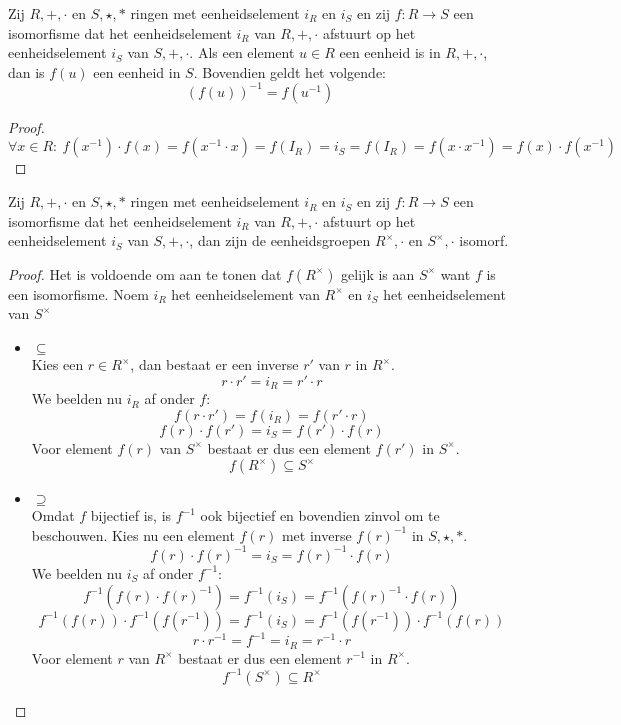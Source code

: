 \documentclass[main.tex]{subfiles}
\begin{document}
\begin{ei}
  \label{ei:ringmorfisme-behoudt-multiplicatieve-inverse}
  Zij $R,+,\cdot$ en $S,\star,*$ ringen met eenheidselement $i_{R}$ en $i_{S}$ en zij $f: R\rightarrow S$ een isomorfisme dat het eenheidselement $i_{R}$ van $R,+,\cdot$ afstuurt op het eenheidselement $i_{S}$ van $S,+,\cdot$.
  Als een element $u\in R$ een eenheid is in $R,+,\cdot$, dan is $f(u)$ een eenheid in $S$.
  Bovendien geldt het volgende:
  \[ (f(u))^{-1} = f(u^{-1}) \]

  \begin{proof}
    \[ \forall x \in R:\ f(x^{-1}) \cdot f(x) = f(x^{-1}\cdot x) = f(I_{R}) = i_{S} = f(I_{R}) = f(x\cdot x^{-1}) = f(x) \cdot f(x^{-1}) \]
  \end{proof}
\end{ei}


\begin{st}
  Zij $R,+,\cdot$ en $S,\star,*$ ringen met eenheidselement $i_{R}$ en $i_{S}$ en zij $f: R\rightarrow S$ een isomorfisme dat het eenheidselement $i_{R}$ van $R,+,\cdot$ afstuurt op het eenheidselement $i_{S}$ van $S,+,\cdot$, dan zijn de eenheidsgroepen $R^{\times},\cdot$ en $S^{\times},\cdot$ isomorf.

  \begin{proof}
    Het is voldoende om aan te tonen dat $f(R^{\times})$ gelijk is aan $S^{\times}$ want $f$ is een isomorfisme.
    Noem $i_{R}$ het eenheidselement van $R^{\times}$ en $i_{S}$ het eenheidselement van $S^{\times}$
    \begin{itemize}
    \item $\subseteq$\\
      Kies een $r\in R^{\times}$, dan bestaat er een inverse $r'$ van $r$ in $R^{\times}$.
      \[ r\cdot r' = i_{R} = r' \cdot r \]
      We beelden nu $i_{R}$ af onder $f$:
      \[ f(r\cdot r') = f(i_{R}) = f(r' \cdot r) \]
      \[ f(r)\cdot f(r') = i_{S} = f(r') \cdot f(r)\]
      Voor element $f(r)$ van $S^{\times}$ bestaat er dus een element $f(r')$ in $S^{\times}$.
      \[ f(R^{\times}) \subseteq S^{\times} \]
    \item $\supseteq$\\
      Omdat $f$ bijectief is, is $f^{-1}$ ook bijectief en bovendien zinvol om te beschouwen.
      Kies nu een element $f(r)$ met inverse $f(r)^{-1}$ in $S,\star,*$.
      \[ f(r) \cdot f(r)^{-1} = i_{S} = f(r)^{-1} \cdot f(r) \]
     We beelden nu $i_{S}$ af onder $f^{-1}$:
     \[ f^{-1}(f(r) \cdot f(r)^{-1}) = f^{-1}(i_{S}) = f^{-1}(f(r)^{-1} \cdot f(r))\]
     \[ f^{-1}(f(r)) \cdot f^{-1}(f(r^{-1})) = f^{-1}(i_{S}) = f^{-1}(f(r^{-1})) \cdot f^{-1}(f(r))\]
     \[ r \cdot r^{-1} = f^{-1} = i_{R} = r^{-1} \cdot r \]
      Voor element $r$ van $R^{\times}$ bestaat er dus een element $r^{-1}$ in $R^{\times}$.
      \[ f^{-1}(S^{\times}) \subseteq R^{\times} \]
    \end{itemize}
  \end{proof}
\end{st}
\end{document}
